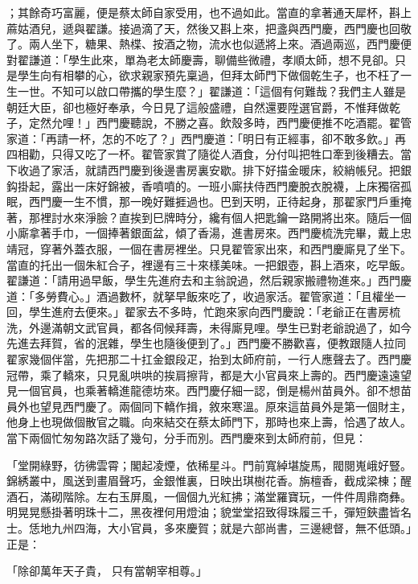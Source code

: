 \begin{showcontents}{}
；其餘奇巧富麗，便是蔡太師自家受用，也不過如此。當直的拿著通天犀杯，斟上蔴姑酒兒，遞與翟謙。接過滴了天，然後又斟上來，把盞與西門慶，西門慶也回敬了。兩人坐下，糖果、熱楪、按酒之物，流水也似遞將上來。酒過兩巡，西門慶便對翟謙道：「學生此來，單為老太師慶壽，聊備些微禮，孝順太師，想不見卻。只是學生向有相攀的心，欲求親家預先稟過，但拜太師門下做個乾生子，也不枉了一生一世。不知可以啟口帶攜的學生麼？」翟謙道：「這個有何難哉？我們主人雖是朝廷大臣，卻也極好奉承，今日見了這般盛禮，自然還要陞選官爵，不惟拜做乾子，定然允哩！」西門慶聽說，不勝之喜。飲殼多時，西門慶便推不吃酒罷。翟管家道：「再請一杯，怎的不吃了？」西門慶道：「明日有正經事，卻不敢多飲。」再四相勸，只得又吃了一杯。翟管家賞了隨從人酒食，分付叫把牲口牽到後糟去。當下收過了家活，就請西門慶到後邊書房裏安歇。排下好描金暖床，絞綃帳兒。把銀鈎掛起，露出一床好錦被，香噴噴的。一班小廝扶侍西門慶脫衣脫襪，上床獨宿孤眠，西門慶一生不慣，那一晚好難捱過也。巴到天明，正待起身，那翟家門戶重掩著，那裡討水來淨臉？直挨到巳牌時分，纔有個人把匙鑰一路開將出來。隨后一個小廝拿著手巾，一個捧著銀面盆，傾了香湯，進書房來。西門慶梳洗完畢，戴上忠靖冠，穿著外蓋衣服，一個在書房裡坐。只見翟管家出來，和西門慶廝見了坐下。當直的托出一個朱紅合子，裡邊有三十來樣美味。一把銀壺，斟上酒來，吃早飯。翟謙道：「請用過早飯，學生先進府去和主翁說過，然后親家搬禮物進來。」西門慶道：「多勞費心。」酒過數杯，就拏早飯來吃了，收過家活。翟管家道：「且權坐一回，學生進府去便來。」翟家去不多時，忙跑來家向西門慶說：「老爺正在書房梳洗，外邊滿朝文武官員，都各伺候拜壽，未得廝見哩。學生已對老爺說過了，如今先進去拜賀，省的泯雜，學生也隨後便到了。」西門慶不勝歡喜，便教跟隨人拉同翟家幾個伴當，先把那二十扛金銀段疋，抬到太師府前，一行人應聲去了。西門慶冠帶，乘了轎來，只見亂哄哄的挨肩擦背，都是大小官員來上壽的。西門慶遠遠望見一個官員，也乘著轎進龍德坊來。西門慶仔細一認，倒是楊州苗員外。卻不想苗員外也望見西門慶了。兩個同下轎作揖，敘來寒溫。原來這苗員外是第一個財主，他身上也現做個散官之職。向來結交在蔡太師門下，那時也來上壽，恰遇了故人。當下兩個忙匆匆路次話了幾句，分手而別。西門慶來到太師府前，但見：

「堂開綠野，彷彿雲霄；閣起凌煙，依稀星斗。門前寬綽堪旋馬，閥閱嵬峨好豎。錦綉叢中，風送到畫眉聲巧，金銀惟裏，日映出琪樹花香。旃檀香，截成梁棟；醒酒石，滿砌階除。左右玉屏風，一個個九光紅拂；滿堂羅寶玩，一件件周鼎商彝。明晃晃懸掛著明珠十二，黑夜裡何用燈油；貌堂堂招致得珠履三千，彈短鋏盡皆名士。恁地九州四海，大小官員，多來慶賀；就是六部尚書，三邊總督，無不低頭。」正是：

「除卻萬年天子貴，  只有當朝宰相尊。」


\end{showcontents}
